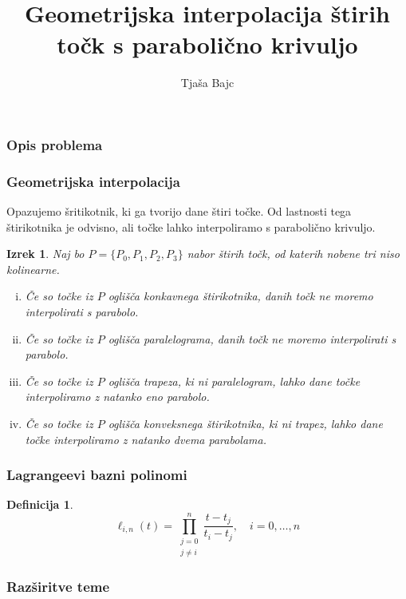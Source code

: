 \documentclass{beamer}
\title{Geometrijska interpolacija štirih točk s parabolično krivuljo}
\author{Tjaša Bajc}
\institute{mentorica \\ izr.~prof.~dr.~Marjetka Knez}
\newtheorem{izrek}{Izrek}
\newtheorem{definicija}{Definicija}
\begin{document}

\begin{frame}
\titlepage
\end{frame}


\begin{frame}
\frametitle{Opis problema}

\end{frame}



\begin{frame}
\frametitle{Geometrijska interpolacija}

Opazujemo šritikotnik, ki ga tvorijo dane štiri točke. Od lastnosti tega štirikotnika je odvisno, ali točke lahko interpoliramo s parabolično krivuljo.

\begin{izrek}
Naj bo $P = \{ P_0, P_1,  P_2, P_3 \}$ nabor štirih točk, od katerih nobene tri niso kolinearne.

\begin{enumerate}[i)]
\item Če so točke iz $P$ oglišča konkavnega štirikotnika, danih točk ne moremo interpolirati s parabolo.
\item Če so točke iz $P$ oglišča paralelograma, danih točk ne moremo interpolirati s parabolo.
\item Če so točke iz $P$ oglišča trapeza, ki ni paralelogram, lahko dane točke interpoliramo z natanko eno parabolo.
\item Če so točke iz $P$ oglišča konveksnega štirikotnika, ki ni trapez, lahko dane točke interpoliramo z natanko dvema parabolama.
\end{enumerate}

\end{izrek}

\end{frame}



\begin{frame}
\frametitle{Lagrangeevi bazni polinomi}

\begin{definicija}

$$ \ell_{i,n}(t) = \prod_{\substack{j=0 \\  j \neq i}}^{n} \frac{t - t_j}{t_i - t_j}, \quad  i = 0, \ldots, n$$
\end{definicija}

\end{frame}


\begin{frame}
\frametitle{Razširitve teme}

\end{frame}

\end{document}
